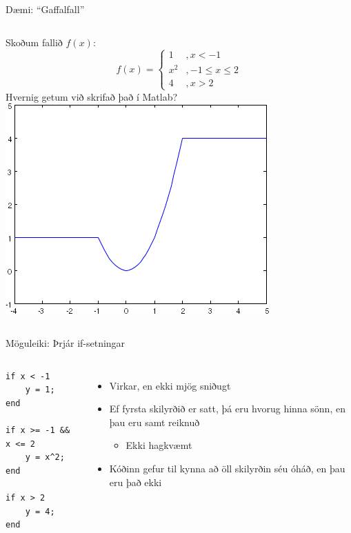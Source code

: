 \documentclass{beamer}
\begin{document}
\begin{frame}{Dæmi: ``Gaffalfall''}
\begin{columns}
Skoðum fallið $f(x)$:
\[
 f(x) =  \left \{
\begin{array}{ll}
1&, x < -1\\
x^2&, -1 \leq x \leq 2\\
4&, x > 2
\end{array}
\right.
\]
Hvernig getum við skrifað það í Matlab?
\includegraphics[width=\linewidth]{Pics/forked-function}
\end{columns}
\end{frame}

\begin{frame}[fragile]{Möguleiki: Þrjár if-setningar}
\begin{columns}
\begin{verbatim}
if x < -1
    y = 1;
end

if x >= -1 && x <= 2
    y = x^2;
end

if x > 2
    y = 4;
end
\end{verbatim}
\begin{itemize}
 \item Virkar, en ekki mjög sniðugt
 \item Ef fyrsta skilyrðið er satt, þá eru hvorug hinna sönn, en þau eru samt reiknuð
 \begin{itemize}
  \item Ekki hagkvæmt
 \end{itemize}
 \item Kóðinn gefur til kynna að öll skilyrðin séu óháð, en þau eru það ekki
\end{itemize}
\end{columns}
\end{frame}
\end{document}
